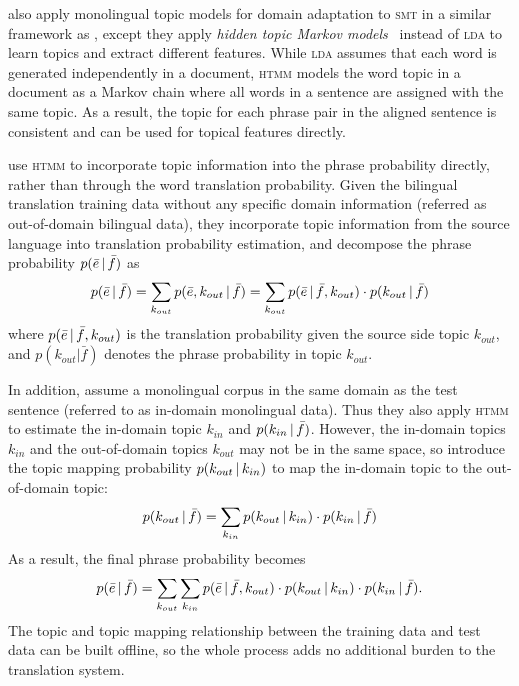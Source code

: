 \citet{hasler-12} also apply monolingual topic models for domain adaptation to
\textsc{smt} in a similar framework as \citet{Eidelman-12}, except
they apply \emph{hidden topic Markov models}~\citep[\textsc{htmm}]{gruber-07} 
instead of \textsc{lda} to learn topics and extract different features. 
While \textsc{lda} assumes that each word is generated
independently in a document, \textsc{htmm} models the word topic in a
document as a Markov chain where all words in a sentence are assigned
with the same topic. As a result, the topic
for each phrase pair in the aligned sentence is consistent and can be
used for topical features directly.


\citet{su-12} use \textsc{htmm} to incorporate topic information
into the phrase probability directly, rather than through the word
translation probability.
Given the bilingual translation
training data without any specific domain information (referred as
out-of-domain bilingual data), they incorporate topic information
from the source language into translation probability estimation, and
decompose the phrase probability $p(\bar{e} \, | \, \bar{f})$ as
\begin{align}
p(\bar{e} \, | \, \bar{f}) = \sum_{k_{out}} p(\bar{e}, k_{out} \, | \, \bar{f})
  = \sum_{k_{out}} p(\bar{e} \, | \, \bar{f}, k_{out})  \cdot p(k_{out} \, | \, \bar{f})
\end{align}
where $p(\bar{e} \, | \, \bar{f}, k_{out})$ is the translation probability given 
the source side topic $k_{out}$, and $p(k_{out} | \bar{f})$ denotes the 
phrase probability in topic $k_{out}$.

In addition, \citet{su-12} assume a monolingual corpus in the
same domain as the test sentence (referred to as in-domain monolingual
data). Thus they also apply \textsc{htmm} to estimate the
in-domain topic $k_{in}$ and $p(k_{in} \, | \, \bar{f})$.  However, the
in-domain topics $k_{in}$ and the out-of-domain topics $k_{out}$ may
not be in the same space, so \citet{su-12} introduce the topic mapping
probability $p(k_{out} \, | \, k_{in})$ to map the in-domain topic to the
out-of-domain topic:
\begin{align}
p(k_{out} \, | \, \bar{f}) = \sum_{k_{in}} p(k_{out} \, | \, k_{in}) \cdot  p(k_{in} \, | \, \bar{f})
\end{align}
As a result, the final phrase probability becomes
\begin{align}
p(\bar{e} \, | \, \bar{f}) = \sum_{k_{out}} \sum_{k_{in}} p(\bar{e} \, | \, \bar{f}, k_{out}) \cdot p(k_{out} \, | \, k_{in}) \cdot p(k_{in} \, | \, \bar{f}).
\end{align}
The topic and topic mapping relationship
between the training data and test data can be built offline, so the
whole process adds no additional burden to the translation system.

